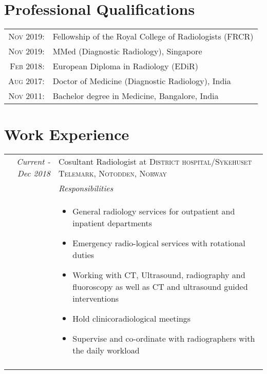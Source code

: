 \documentclass[a4paper,10pt]{article}
\begin{document}
\section{Professional Qualifications}
\begin{tabular}{rl}
\textsc{Nov 2019:}&Fellowship of the Royal College of Radiologists (FRCR)\\
\textsc{Nov 2019:}&MMed (Diagnostic Radiology), Singapore\\
\textsc{Feb 2018:}&European Diploma in Radiology (EDiR)\\
\textsc{Aug 2017:}&Doctor of Medicine (Diagnostic Radiology), India\\
\textsc{Nov 2011:}&Bachelor degree in Medicine, Bangalore, India\\
\end{tabular}

\section{Work Experience}

\begin{tabular}{r|p{11cm}}
\emph{Current -Dec 2018} & Cosultant Radiologist at \textsc{District hospital/Sykehuset Telemark, Notodden, Norway} \\
 
\textsc{}&\emph{Responsibilities}\\&\footnotesize{

\begin{itemize} 
        \vspace{-0.2cm}\item General radiology services for outpatient and inpatient departments
        \vspace{-0.2cm}\item Emergency radio-logical services with rotational duties
        \vspace{-0.2cm}\item Working with CT, Ultrasound, radiography and fluoroscopy as well as CT and ultrasound guided interventions
        \vspace{-0.2cm}\item Hold clinicoradiological meetings
        \vspace{-0.2cm}\item Supervise and co-ordinate with radiographers with the daily workload
     \end{itemize}
}\\\multicolumn{2}{c}{} \\
\end{tabular}
\vspace{-0.2cm}
\end{document}
